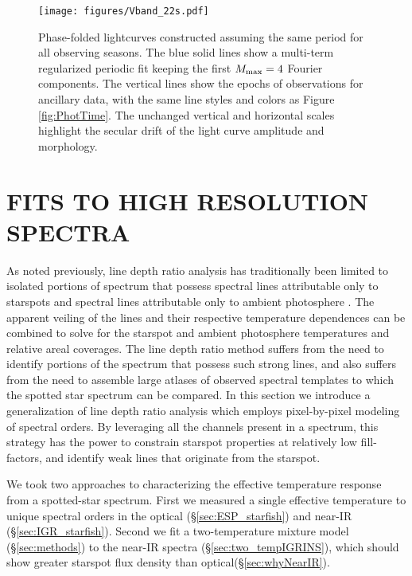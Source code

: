 \documentclass[twocolumn]{emulateapj}%
\begin{document}
\begin{figure*}
	\centering
	\texttt{[image: figures/Vband\_22s.pdf]}
	\caption{Phase-folded lightcurves constructed assuming the same period for all observing seasons.  The blue solid lines show a multi-term regularized periodic fit keeping the first $M_{\rm max}=4$ Fourier components.  The vertical lines show the epochs of observations for ancillary data, with the same line styles and colors as Figure \ref{fig:PhotTime}.  The unchanged vertical and horizontal scales highlight the secular drift of the light curve amplitude and morphology.}
	\label{fig:PhotPhase}
\end{figure*}





\section{FITS TO HIGH RESOLUTION SPECTRA}\label{sec:Starfish}

As noted previously, line depth ratio analysis has traditionally been limited to isolated portions of spectrum that possess spectral lines attributable only to starspots and spectral lines attributable only to ambient photosphere \citep[\emph{e.g.}][]{neff95, oneal01}.  The apparent veiling of the lines and their respective temperature dependences can be combined to solve for the starspot and ambient photosphere temperatures and relative areal coverages.  The line depth ratio method suffers from the need to identify portions of the spectrum that possess such strong lines, and also suffers from the need to assemble large atlases of observed spectral templates to which the spotted star spectrum can be compared.  In this section we introduce a generalization of line depth ratio analysis which employs pixel-by-pixel modeling of spectral orders.  By leveraging all the channels present in a spectrum, this strategy has the power to constrain starspot properties at relatively low fill-factors, and identify weak lines that originate from the starspot.

We took two approaches to characterizing the effective temperature response from a spotted-star spectrum.  First we measured a single effective temperature to unique spectral orders in the optical (\S \ref{sec:ESP_starfish}) and near-IR (\S \ref{sec:IGR_starfish}).  Second we fit a two-temperature mixture model (\S \ref{sec:methods}) to the near-IR spectra (\S \ref{sec:two_tempIGRINS}), which should show greater starspot flux density than optical(\S \ref{sec:whyNearIR}).
\end{document}
